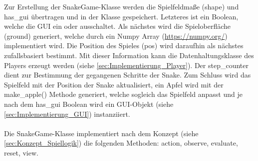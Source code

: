 Zur Erstellung der SnakeGame-Klasse werden die Spielfeldmaße (shape) und has\_gui übertragen und in der Klasse gespeichert. Letzteres ist ein Boolean, welche die GUI ein oder ausschaltet. Als nächstes wird die Spieloberfläche (ground) generiert, welche durch ein Numpy Array (\url{https://numpy.org/}) implementiert wird. Die Position des Spieles (pos) wird daraufhin als nächstes zufallsbasiert bestimmt. Mit dieser Information kann die Datenhaltungsklasse des Players erzeugt werden (siehe \ref{sec:Implementierung_Player}). Der step\_counter dient zur Bestimmung der gegangenen Schritte der Snake. Zum Schluss wird das Spielfeld mit der Position der Snake aktualisiert, ein Apfel wird mit der make\_apple() Methode generiert, welche sogleich das Spielfeld anpasst und je nach dem has\_gui Boolean wird ein GUI-Objekt (siehe \ref{sec:Implementierung_GUI}) instanziiert.\\
\\Die SnakeGame-Klasse implementiert nach dem Konzept (siehe \ref{sec:Konzept_Spiellogik}) die folgenden Methoden: action, observe, evaluate, reset, view.

